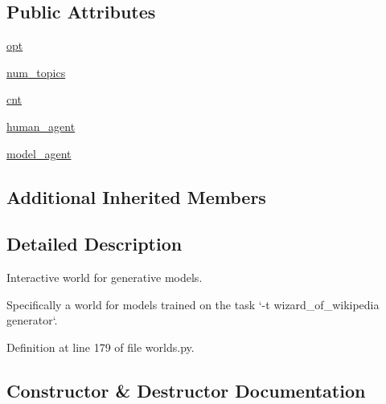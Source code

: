 \subsection*{Public Attributes}
\begin{DoxyCompactItemize}
\item 
\hyperlink{classparlai_1_1tasks_1_1wizard__of__wikipedia_1_1worlds_1_1InteractiveGeneratorWorld_aef25f6c11236d9465445b81dff86c31f}{opt}
\item 
\hyperlink{classparlai_1_1tasks_1_1wizard__of__wikipedia_1_1worlds_1_1InteractiveGeneratorWorld_aaa612edaa6b4fdbe8a79e197404f819c}{num\+\_\+topics}
\item 
\hyperlink{classparlai_1_1tasks_1_1wizard__of__wikipedia_1_1worlds_1_1InteractiveGeneratorWorld_ad00587b5ca8230fb8f550d2221445490}{cnt}
\item 
\hyperlink{classparlai_1_1tasks_1_1wizard__of__wikipedia_1_1worlds_1_1InteractiveGeneratorWorld_ab225163f69d7aa9c5a24fb89860866b9}{human\+\_\+agent}
\item 
\hyperlink{classparlai_1_1tasks_1_1wizard__of__wikipedia_1_1worlds_1_1InteractiveGeneratorWorld_a53d109f7d4475d3a272ab2834483c6ce}{model\+\_\+agent}
\end{DoxyCompactItemize}
\subsection*{Additional Inherited Members}


\subsection{Detailed Description}
\begin{DoxyVerb}Interactive world for generative models.

Specifically a world for models trained on the task `-t wizard_of_wikipedia
generator`.
\end{DoxyVerb}
 

Definition at line 179 of file worlds.\+py.



\subsection{Constructor \& Destructor Documentation}
\mbox{\label{classparlai_1_1tasks_1_1wizard__of__wikipedia_1_1worlds_1_1InteractiveGeneratorWorld_aa0a062edf765935670b849cae9b6d5fc}} 
